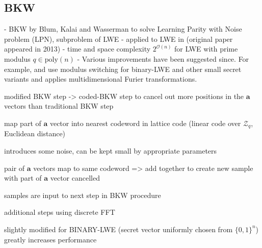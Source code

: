 {\subsection{BKW \cite{BKW03}}

- BKW by Blum, Kalai and Wasserman \cite{BKW03} to solve Learning Parity with Noise problem (LPN), subproblem of LWE
- applied to LWE in \cite{ACFFP15a} (original paper appeared in 2013)
- time and space complexity $2^{\mathcal{O}(n)}$ for LWE with prime modulus $q \in \text{poly}(n)$ %
- Various improvements have been suggested since. For example, \cite{AFFP14} and \cite{KF15} use modulus switching for binary-LWE and other small secret variants \cite{AFFP14} and \cite{DTV15} applies multidimensional Furier transformations. %

modified BKW step -> coded-BKW step to cancel out more positions in the $\mathbf{a}$ vectors than traditional BKW step

map part of $\mathbf{a}$ vector into nearest codeword in lattice code (linear code over $\mathcal{Z}_q$, Euclidean distance)

introduces some noise, can be kept small by appropriate parameters

pair of $\mathbf{a}$ vectors map to same codeword => add together to create new sample with part of $\mathbf{a}$ vector cancelled

samples are input to next step in BKW procedure

additional steps using discrete FFT

slightly modified for BINARY-LWE (secret vector uniformly chosen from $\{0, 1\}^n$) greatly increases performance

}
